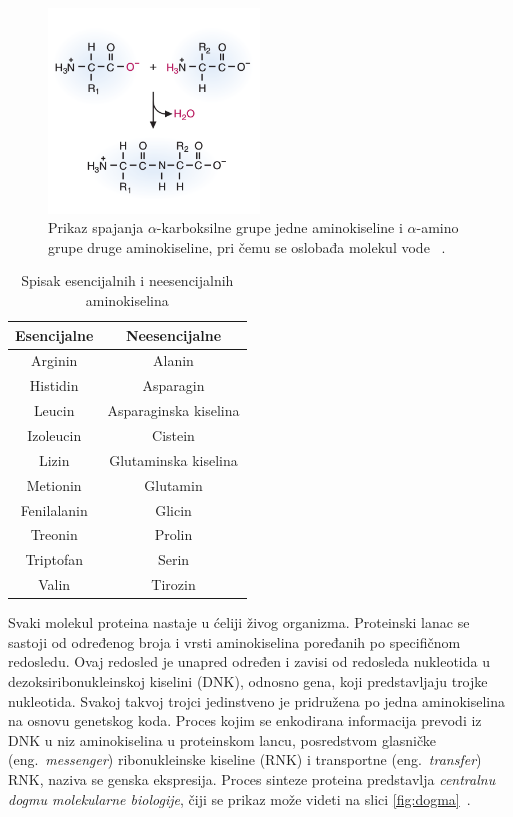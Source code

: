 \begin{figure}[h]
	\centering
    \includegraphics[width=0.5\textwidth]{Figures/BO/peptide_bonds.png}
    \caption{Prikaz spajanja $\alpha$-karboksilne grupe jedne aminokiseline i $\alpha$-amino grupe druge aminokiseline, pri čemu se oslobađa molekul vode ~\cite{bmbg}.}
    \label{fig:peptidebonds}
\end{figure}

\begin{table}[h!]
\centering
	\begin{tabular}{||c c||} 
	\hline 
	Esencijalne & Neesencijalne \\ [0.5ex] 
	\hline\hline
	Arginin & Alanin \\ 
	\hline
	Histidin & Asparagin \\
	\hline
	Leucin & Asparaginska kiselina\\
	\hline
	Izoleucin & Cistein \\
	\hline
	Lizin & Glutaminska kiselina \\ [1ex] 
	\hline
	Metionin & Glutamin \\ [1ex] 
	\hline
	Fenilalanin & Glicin \\ [1ex] 
	\hline
	Treonin & Prolin \\ [1ex] 
	\hline
	Triptofan & Serin \\ [1ex] 
	\hline
	Valin & Tirozin \\ [1ex] 
	\hline
	\end{tabular}
\caption{Spisak esencijalnih i neesencijalnih aminokiselina}
\label{table:1}
\end{table}


Svaki molekul proteina nastaje u ćeliji živog organizma. Proteinski lanac se sastoji od određenog broja i vrsti aminokiselina poređanih po specifičnom redosledu. Ovaj redosled je unapred određen i zavisi od redosleda nukleotida u dezoksiribonukleinskoj kiselini (DNK), odnosno gena, koji predstavljaju trojke nukleotida. Svakoj takvoj trojci jedinstveno je pridružena po jedna aminokiselina na osnovu genetskog koda. Proces kojim se enkodirana informacija prevodi iz DNK u niz aminokiselina u proteinskom lancu, posredstvom glasničke (eng.~{\em messenger}) ribonukleinske kiseline (RNK) i transportne (eng.~{\em transfer}) RNK, naziva se genska ekspresija. Proces sinteze proteina predstavlja \textit{centralnu dogmu molekularne biologije}, čiji se prikaz može videti na slici \ref{fig:dogma}~\cite{JKd}.

